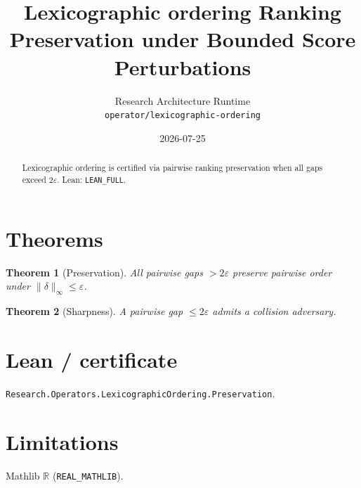 \documentclass[11pt]{article}
\title{Lexicographic ordering Ranking Preservation under Bounded Score Perturbations}
\author{Research Architecture Runtime \\ \texttt{operator/lexicographic-ordering}}
\date{2026-07-25}
\newtheorem{theorem}{Theorem}
\begin{document}
\maketitle
\begin{abstract}
Lexicographic ordering is certified via pairwise ranking preservation when all gaps exceed $2\varepsilon$. Lean: \texttt{LEAN\_FULL}.
\end{abstract}
\section{Theorems}
\begin{theorem}[Preservation]
All pairwise gaps $>2\varepsilon$ preserve pairwise order under $\|\delta\|_\infty\le\varepsilon$.
\end{theorem}
\begin{theorem}[Sharpness]
A pairwise gap $\le 2\varepsilon$ admits a collision adversary.
\end{theorem}
\section{Lean / certificate}
\texttt{Research.Operators.LexicographicOrdering.Preservation}.
\section{Limitations}
Mathlib $\mathbb{R}$ (\texttt{REAL\_MATHLIB}).
\end{document}
